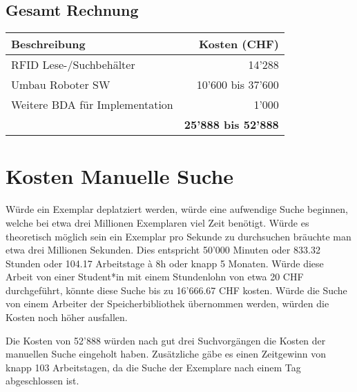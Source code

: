 \subsection{Gesamt Rechnung}
\begin{tabularx}{\textwidth}{|X|r|}
	\hline
	\textbf{Beschreibung} & \textbf{Kosten (CHF)} \\
	\hline
	RFID Lese-/Suchbehälter & 14'288 \\
	\hline
	Umbau Roboter SW & 10'600 bis 37'600 \\
	\hline
	Weitere BDA für Implementation & 1'000 \\
	\hline
	& \textbf{25'888 bis 52'888} \\
	\hline
\end{tabularx}

\section{Kosten Manuelle Suche}
Würde ein Exemplar deplatziert werden, würde eine aufwendige Suche beginnen, welche bei etwa drei Millionen Exemplaren viel Zeit benötigt. Würde es theoretisch möglich sein ein Exemplar pro Sekunde zu durchsuchen bräuchte man etwa drei Millionen Sekunden. Dies entspricht 50'000 Minuten oder 833.32 Stunden oder 104.17 Arbeitstage à 8h oder knapp 5 Monaten. Würde diese Arbeit von einer Student*in mit einem Stundenlohn von etwa 20 CHF durchgeführt, könnte diese Suche bis zu 16'666.67 CHF kosten. Würde die Suche von einem Arbeiter der Speicherbibliothek übernommen werden, würden die Kosten noch höher ausfallen.

Die Kosten von 52'888 würden nach gut drei Suchvorgängen die Kosten der manuellen Suche eingeholt haben. Zusätzliche gäbe es einen Zeitgewinn von knapp 103 Arbeitstagen, da die Suche der Exemplare nach einem Tag abgeschlossen ist.
